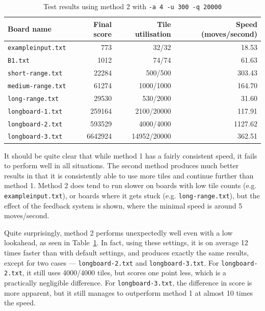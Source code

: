 \documentclass[a4paper, 11pt, titlepage]{report}
\begin{document}
\begin{table}[H]
  \centering
  \caption{Test results using method 2 with \texttt{-a 4 -u 300 -q 20000}}
    \begin{tabular}{lrrr}
    \hline
    Board name & Final score & Tile utilisation & Speed (moves/second) \\
    \hline
    \texttt{exampleinput.txt} &   773    &   32/32    & 18.53  \\
    \texttt{B1.txt} &   1012    &  74/74     &  61.63 \\
    \texttt{short-range.txt} & 22284 & 500/500 & 303.43 \\
    \texttt{medium-range.txt} & 61274 & 1000/1000 & 164.70 \\
    \texttt{long-range.txt} & 29530 & 530/2000 & 31.60 \\
    \texttt{longboard-1.txt} & 259164 & 2100/20000 & 117.91 \\
    \texttt{longboard-2.txt} & 593529 & 4000/4000 & 1127.62 \\
    \texttt{longboard-3.txt} & 6642924 & 14952/20000 & 362.51 \\
    \hline
    \end{tabular}%
  \label{tab:results-method2-modded}%
\end{table}%

It should be quite clear that while method 1 has a fairly consistent speed, it fails to perform well in all situations. The second method produces much better results in that it is consistently able to use more tiles and continue further than method 1. Method 2 does tend to run slower on boards with low tile counts (e.g. \texttt{exampleinput.txt}), or boards where it gets stuck (e.g. \texttt{long-range.txt}), but the effect of the feedback system is shown, where the minimal speed is around 5 moves/second.

Quite surprisingly, method 2 performs unexpectedly well even with a low lookahead, as seen in Table~\ref{tab:results-method2-modded}. In fact, using these settings, it is on average 12 times faster than with default settings, and produces exactly the same results, except for two cases --- \texttt{longboard-2.txt} and \texttt{longboard-3.txt}. For \texttt{longboard-2.txt}, it still uses 4000/4000 tiles, but scores one point less, which is a practically negligible difference. For \texttt{longboard-3.txt}, the difference in score is more apparent, but it still manages to outperform method 1 at almost 10 times the speed.
\end{document}
